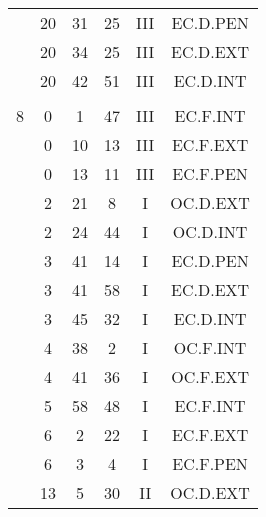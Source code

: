 \documentclass[12pt, a4paper]{article}
\begin{document}
\begin{multicols}{3}
{\begin{tabular}{c c c c c c}
	 	 	 	 & 20 & 31 & 25 & III & EC.D.PEN\\%
	 	 	 	 & 20 & 34 & 25 & III & EC.D.EXT\\%
	 	 	 	 & 20 & 42 & 51 & III & EC.D.INT\\%
	 	 	 	 & & & & & \\%
	 	 	 	8 & 0 & 1 & 47 & III & EC.F.INT\\%
	 	 	 	 & 0 & 10 & 13 & III & EC.F.EXT\\%
	 	 	 	 & 0 & 13 & 11 & III & EC.F.PEN\\%
	 	 	 	 & 2 & 21 & 8 & I & OC.D.EXT\\%
	 	 	 	 & 2 & 24 & 44 & I & OC.D.INT\\%
	 	 	 	 & 3 & 41 & 14 & I & EC.D.PEN\\%
	 	 	 	 & 3 & 41 & 58 & I & EC.D.EXT\\%
	 	 	 	 & 3 & 45 & 32 & I & EC.D.INT\\%
	 	 	 	 & 4 & 38 & 2 & I & OC.F.INT\\%
	 	 	 	 & 4 & 41 & 36 & I & OC.F.EXT\\%
	 	 	 	 & 5 & 58 & 48 & I & EC.F.INT\\%
	 	 	 	 & 6 & 2 & 22 & I & EC.F.EXT\\%
	 	 	 	 & 6 & 3 & 4 & I & EC.F.PEN\\%
	 	 	 	 & 13 & 5 & 30 & II & OC.D.EXT\\%
	 	 \end{tabular}
 	}
\end{multicols}
\end{document}
